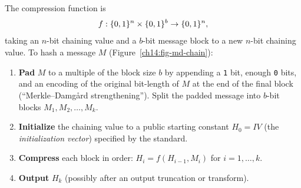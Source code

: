 The compression function is
\[
  f : \{0,1\}^{n} \times \{0,1\}^{b} \to \{0,1\}^{n},
\]
taking an $n$-bit chaining value and a $b$-bit message block to a new $n$-bit chaining value. To hash a message $M$ (Figure~\ref{ch14:fig-md-chain}):

\begin{enumerate}
  \item \textbf{Pad} $M$ to a multiple of the block size $b$ by appending a \texttt{1} bit, enough \texttt{0} bits, and an encoding of the original bit-length of $M$ at the end of the final block (``Merkle--Damg\aa{}rd strengthening''). Split the padded message into $b$-bit blocks $M_1, M_2, \dots, M_k$.
  \item \textbf{Initialize} the chaining value to a public starting constant $H_0 = \mathit{IV}$ (the \emph{initialization vector}) specified by the standard.
  \item \textbf{Compress} each block in order: $H_i = f(H_{i-1}, M_i)$ for $i = 1, \dots, k$.
  \item \textbf{Output} $H_k$ (possibly after an output truncation or transform).
\end{enumerate}

